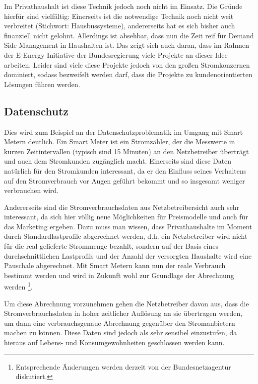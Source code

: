 \documentclass[12pt,BCOR=8.5mm]{scrartcl}
\begin{document}
Im Privathaushalt ist diese Technik jedoch noch nicht im Einsatz. Die
Gründe hierfür sind vielfältig: Einerseits ist die notwendige Technik
noch nicht weit verbreitet (Stichwort: Hausbussysteme), andererseits hat
es sich bisher auch finanziell nicht gelohnt. Allerdings ist absehbar,
dass nun die Zeit reif für Demand Side Management in Haushalten ist. Das
zeigt sich auch daran, dass im Rahmen der E-Energy Initiative der
Bundesregierung viele Projekte an dieser Idee arbeiten. Leider sind viele diese Projekte jedoch von den großen
Stromkonzernen dominiert, sodass bezweifelt werden darf, dass die
Projekte zu kundenorientierten Lösungen führen werden. 


\subsection{Datenschutz}\label{sub:datenschutz}

Dies wird zum Beispiel an der Datenschutzproblematik im Umgang mit Smart
Metern deutlich. Ein Smart Meter ist ein Stromzähler, der die Messwerte
in kurzen Zeitintervallen (typisch sind 15 Minuten) an den Netzbetreiber
überträgt und auch dem Stromkunden zugänglich macht. Einerseits sind
diese Daten natürlich für den Stromkunden interessant, da er den
Einfluss seines Verhaltens auf den Stromverbrauch vor Augen geführt
bekommt und so insgesamt weniger verbrauchen wird.

Andererseits sind die Stromverbrauchsdaten aus Netzbetreibersicht auch
sehr interessant, da sich hier völlig neue Möglichkeiten für
Preismodelle und auch für das Marketing ergeben. Dazu muss man wissen,
dass Privathaushalte im Moment durch Standardlastprofile abgerechnet
werden, d.h. ein Netzbetreiber wird nicht für die real gelieferte
Strommenge bezahlt, sondern auf der Basis eines durchschnittlichen
Lastprofils und der Anzahl der versorgten Haushalte wird eine Pauschale
abgerechnet. Mit Smart Metern kann nun der reale Verbrauch bestimmt
werden und wird in Zukunft wohl zur Grundlage der Abrechnung werden
\footnote{Entsprechende Änderungen werden derzeit von der
Bundesnetzagentur diskutiert.}. 

Um diese Abrechnung vorzunehmen gehen die Netzbetreiber davon aus, dass
die Stromverbrauchsdaten in hoher zeitlicher Auflösung an sie
übertragen werden, um dann eine verbrauchsgenaue Abrechnung gegenüber
den Stromanbietern machen zu können.
Diese Daten sind jedoch als sehr sensibel einzustufen, da hieraus auf
Lebens- und Konsumgewohnheiten geschlossen werden kann.
\end{document}
